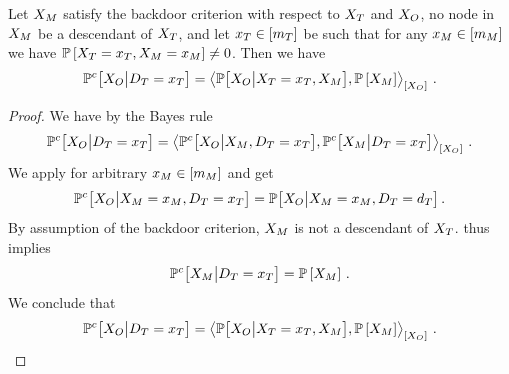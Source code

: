 \begin{theorem}\label{the:backdoorCriterion}
    Let $X_{M}$ satisfy the backdoor criterion with respect to $X_{T}$ and $X_{O}$, no node in $X_{M}$ be a descendant of $X_{T}$, and let $x_{T}\in[m_{T}]$ be such that for any $x_{M}\in[m_{M}]$ we have $\mathbb{P}\left[X_{T}=x_{T},X_{M}=x_{M}\right]\neq0$.
    Then we have
    \begin{align*}
        \mathbb{P}^{c}\big[X_{O}\big|D_{T}=x_{T}\big]
        = \left\langle 
            \mathbb{P}\big[X_{O}\big|X_{T}=x_{T},X_{M}\big],
            \mathbb{P}\left[X_{M}\right]
        \right\rangle_{\left[ X_{O} \right]} \, .
    \end{align*}
\end{theorem}
\begin{proof}
    We have by the Bayes rule
    \begin{align*}
        \mathbb{P}^{c}\big[X_{O}\big|D_{T}=x_{T}\big]
        = \left\langle 
            \mathbb{P}^{c}\big[X_{O}\big|X_{M},D_{T}=x_{T}\big],
            \mathbb{P}^{c}\big[X_{M}\big|D_{T}=x_{T}\big]
        \right\rangle_{\left[ X_{O} \right]} \, .
    \end{align*}
    We apply  for arbitrary $x_{M}\in[m_{M}]$ and get
    \begin{align*}
        \mathbb{P}^{c}\big[X_{O}\big|X_{M}=x_{M},D_{T}=x_{T}\big]
        = \mathbb{P}\big[X_{O}\big|X_{M}=x_{M},D_{T}=d_{T}\big] \, .
    \end{align*}
    By assumption of the backdoor criterion, $X_{M}$ is not a descendant of $X_{T}$.
     thus implies
    \begin{align*}
        \mathbb{P}^{c}\big[X_{M}\big|D_{T}=x_{T}\big]
        = \mathbb{P}\left[X_{M}\right] \, .
    \end{align*}
    We conclude that
    \begin{align*}
        \mathbb{P}^{c}\big[X_{O}\big|D_{T}=x_{T}\big]
        = \left\langle 
            \mathbb{P}\big[X_{O}\big|X_{T}=x_{T},X_{M}\big],
            \mathbb{P}\left[X_{M}\right]
        \right\rangle_{\left[ X_{O} \right]} \, .
    \end{align*}
\end{proof}

